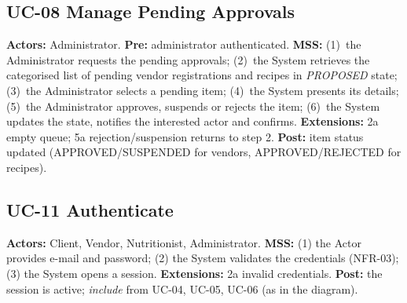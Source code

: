 \subsection*{UC-08 Manage Pending Approvals}
\textbf{Actors:} Administrator. \textbf{Pre:} administrator authenticated.
\textbf{MSS:} (1)~the Administrator requests the pending approvals;
(2)~the System retrieves the categorised list of pending vendor registrations
and recipes in \emph{PROPOSED} state; (3)~the Administrator selects a pending
item; (4)~the System presents its details; (5)~the Administrator approves,
suspends or rejects the item; (6)~the System updates the state, notifies the
interested actor and confirms. \textbf{Extensions:} 2a empty queue; 5a
rejection/suspension returns to step 2. \textbf{Post:} item status updated
(APPROVED/SUSPENDED for vendors, APPROVED/REJECTED for recipes).

\subsection*{UC-11 Authenticate}
\textbf{Actors:} Client, Vendor, Nutritionist, Administrator. \textbf{MSS:} (1) the Actor provides
e-mail and password; (2) the System validates the credentials (NFR-03);
(3) the System opens a session. \textbf{Extensions:} 2a invalid credentials.
\textbf{Post:} the session is active; \emph{include} from UC-04, UC-05, UC-06 (as in the diagram).
